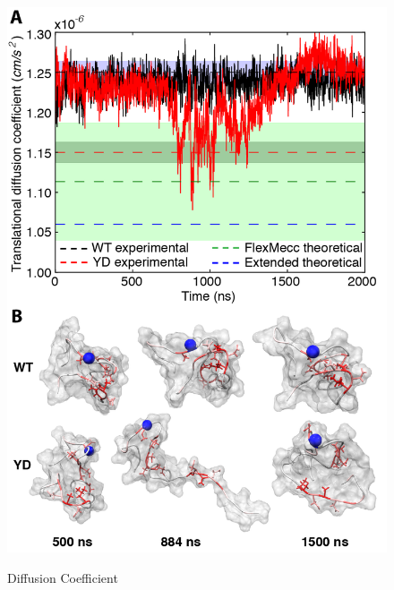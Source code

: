 \begin{figure}
\includegraphics{figures/Figure_7.png}
\label{dc}
\caption{Diffusion Coefficient}
\end{figure}

